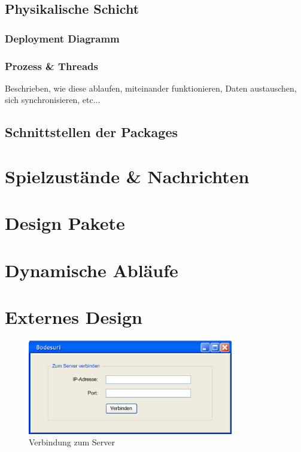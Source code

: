 \documentclass[a4paper,12pt,halfparskip,DIV14]{scrartcl}
\begin{document}

\newpage
\subsection{Physikalische Schicht} %
\label{sub:physikalische_schicht}

\subsubsection{Deployment Diagramm} %
\label{sub:deployment_diagramm}

\subsubsection{Prozess \& Threads} %
\label{sub:prozess_threads}
\label{sub:prozesse_threads}
Beschrieben, wie diese ablaufen, miteinander funktionieren, Daten austauschen, sich synchronisieren, etc...

\newpage
\subsection{Schnittstellen der Packages} %
\label{sub:schnittstellen_der_packages}

\newpage
\section{Spielzustände \& Nachrichten} %
\label{spielzustaende_nachrichten}

\newpage
\section{Design Pakete} %
\label{design_pakete}

\newpage
\section{Dynamische Abläufe} %
\label{dynamische_ablauefe}

\newpage
\section{Externes Design} %
\label{externes_design}

\begin{figure}[h]
	\centering
		\includegraphics[width=0.80\textwidth]{Externes Design - Verbindung.png}
		\caption{Verbindung zum Server}
	\label{fig:Externes Design - Verbindung}
\end{figure}
\end{document}
